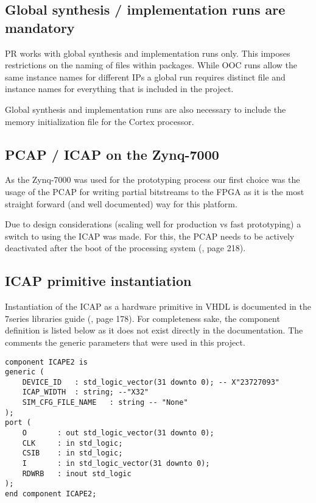 \subsection{Global synthesis / implementation runs are mandatory}
\gls{PR} works with global synthesis and implementation runs only.
This imposes restrictions on the naming of files within packages. 
While \gls{OOC} runs allow the same instance names for different IPs a global run requires distinct file and instance names for everything that is included in the project.

Global synthesis and implementation runs are also necessary to include the memory initialization file for the Cortex processor. 

\subsection{\gls{PCAP} / \gls{ICAP} on the Zynq-7000}
As the Zynq-7000 was used for the prototyping process our first choice was the usage of the \gls{PCAP} for writing partial bitstreams to the \gls{FPGA} as it is the most straight forward (and well documented) way for this platform.

Due to design considerations (scaling well for production vs fast prototyping) a switch to using the \gls{ICAP} was made.
For this, the \gls{PCAP} needs to be actively deactivated after the boot of the processing system (\cite{zynq_7000_technical_manual}, page 218).

\subsection{\gls{ICAP} primitive instantiation}
Instantiation of the \gls{ICAP} as a hardware primitive in VHDL is documented in the 7series libraries guide (\cite{7series_libraries_guide}, page 178).
For completeness sake, the component definition is listed below as it does not exist directly in the documentation.
The comments the generic parameters that were used in this project.
\lstset{language=vhdl}
\begin{lstlisting}
component ICAPE2 is
generic (
    DEVICE_ID   : std_logic_vector(31 downto 0); -- X"23727093" 
    ICAP_WIDTH  : string; --"X32"
    SIM_CFG_FILE_NAME 	: string -- "None"
);   
port (
    O 		: out std_logic_vector(31 downto 0);
    CLK 	: in std_logic;
    CSIB 	: in std_logic;
    I 		: in std_logic_vector(31 downto 0);
    RDWRB 	: inout std_logic
);
end component ICAPE2;
\end{lstlisting}

